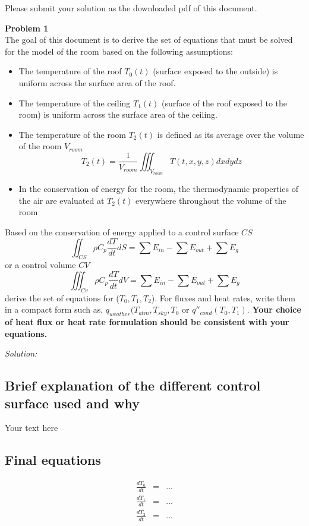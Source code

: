 \documentclass{article}
\newenvironment{problem}[2][Problem]
    { \begin{mdframed}[backgroundcolor=white] \textbf{#1 #2} \\}
    {  \end{mdframed}}
\newenvironment{solution}
    {\textit{Solution:}}
    {}
\begin{document}
\begin{mdframed}[backgroundcolor=blue!20]
Please submit your solution as the downloaded pdf of this document.
\end{mdframed}

\begin{problem}{1}

The goal of this document is to derive the set of equations that must be solved for the model of the room based on the following assumptions:
\begin{itemize}
    \item The temperature of the roof $T_0(t)$ (surface exposed to the outside) is uniform across the surface area of the roof.
    \item The temperature of the ceiling $T_1(t)$ (surface of the roof exposed to the room) is uniform across the surface area of the ceiling.
    \item The temperature of the room $T_2(t)$ is defined as its average over the volume of the room $V_{room}$
    \begin{equation*}
        T_2(t)=\frac{1}{V_{room}}\iiint_{V_{room}}T(t,x,y,z)dxdydz
    \end{equation*}
    \item In the conservation of energy for the room, the thermodynamic properties of the air are evaluated at $T_2(t)$ everywhere throughout the volume of the room
\end{itemize}
Based on the conservation of energy applied to a control surface $CS$
\begin{equation}
    \iint_{CS}\rho C_p \frac{dT}{dt}dS=\sum E_{in}-\sum E_{out}+ \sum E_g
\end{equation}
or a control volume $CV$
\begin{equation}
    \iiint_{Cv}\rho C_p \frac{dT}{dt}dV=\sum E_{in}-\sum E_{out}+ \sum E_g
\end{equation}
derive the set of equations for ($T_0,T_1,T_2$). For fluxes and heat rates, write them in a compact form such as, $q_{weather}(T_{atm},T_{sky},T_0$ or $q''_{cond}(T_0,T_1)$. \textbf{Your choice of heat flux or heat rate formulation should be consistent with your equations.}
\end{problem}
\begin{solution}
\subsection*{Brief explanation of the different control surface used and why}
Your text here 

\subsection*{Final equations}
\begin{eqnarray}
\frac{dT_0}{dt}&=&...\\
\frac{dT_1}{dt}&=&...\\
\frac{dT_2}{dt}&=&...
\end{eqnarray}

\end{solution}
\end{document}

